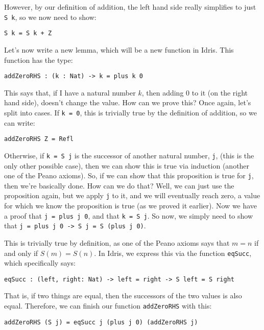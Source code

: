 \documentclass{article}
\newcommand{\inline}[1]{\texttt{#1}}
\begin{document}
However, by our definition of addition, the left hand side really simplifies to just \inline{S k}, so we now need to show:

\begin{verbatim}
S k = S k + Z
\end{verbatim}

Let’s now write a new lemma, which will be a new function in Idris.
This function has the type:

\begin{verbatim}
addZeroRHS : (k : Nat) -> k = plus k 0
\end{verbatim}

This says that, if I have a natural number $k$, then adding $0$ to it (on the right hand side), doesn’t change the value.
How can we prove this?
Once again, let’s split into cases.
If \inline{k = 0}, this is trivially true by the definition of addition, so we can write:

\begin{verbatim}
addZeroRHS Z = Refl
\end{verbatim}

Otherwise, if \inline{k = S j} is the successor of another natural number, \inline{j}, (this is the only other possible case), then we can show this is true via induction (another one of the Peano axioms).
So, if we can show that this proposition is true for \inline{j}, then we’re basically done.
How can we do that?
Well, we can just use the proposition again, but we apply \inline{j} to it, and we will eventually reach zero, a value for which we know the proposition is true (as we proved it earlier).
Now we have a proof that \inline{j = plus j 0}, and that \inline{k = S j}.
So now, we simply need to show that \inline{j = plus j 0 -> S j = S (plus j 0)}.

This is trivially true by definition, as one of the Peano axioms says that $m=n$ if and only if $S(m)=S(n)$.
In Idris, we express this via the function \inline{eqSucc}, which specifically says:

\begin{verbatim}
eqSucc : (left, right: Nat) -> left = right -> S left = S right
\end{verbatim}

That is, if two things are equal, then the successors of the two values is also equal.
Therefore, we can finish our function \inline{addZeroRHS} with this:

\begin{verbatim}
addZeroRHS (S j) = eqSucc j (plus j 0) (addZeroRHS j)
\end{verbatim}
\end{document}
